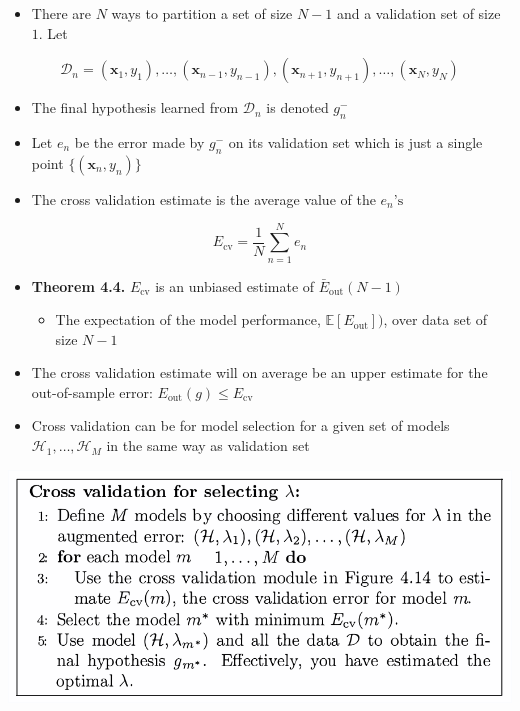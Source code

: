 \documentclass[11pt]{article}
\begin{document}
\begin{itemize}
\item There are \(N\) ways to partition a set of size \(N-1\) and a validation set of size \(1\). Let
\end{itemize}
\begin{equation}
  \mathcal D_n = (\pmb x_1, y_1), \dots, (\pmb x_{n-1}, y_{n-1}), (\pmb x_{n+1}, y_{n+1}), \dots, (\pmb x_N, y_N)
\end{equation}
\begin{itemize}
\item The final hypothesis learned from \(\mathcal D_n\) is denoted \(g_n^-\)
\item Let \(e_n\) be the error made by \(g_n^-\) on its validation set which is just a single point \(\{(\pmb x_n, y_n)\}\)
\item The cross validation estimate is the average value of the \(e_n\text{'s}\)
\end{itemize}
\begin{equation}
  E_\text{cv}=\frac1N \sum_{n=1}^Ne_n
\end{equation}

\begin{itemize}
\item \textbf{Theorem 4.4.} \(E_\text{cv}\) is an unbiased estimate of \(\bar E_\text{out}(N-1)\)
\begin{itemize}
\item The expectation of the model performance, \(\mathbb E[E_\text{out}])\), over data set of size \(N-1\)
\end{itemize}

\item The cross validation estimate will on average be an upper estimate for the out-of-sample error: \(E_\text{out}(g) \leq E_\text{cv}\)

\item Cross validation can be for model selection for a given set of models \(\mathcal H_1, \dots, \mathcal H_M\) in the same way as validation set
\end{itemize}

\begin{center}
\includegraphics[width=.9\linewidth]{Overfitting (4)/screenshot_2018-09-18_20-42-49.png}
\end{center}
\end{document}
